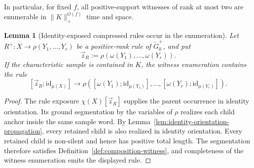 \documentclass[11pt,a4paper]{article}
\numberwithin{equation}{section}
\theoremstyle{plain}
\newtheorem{lemma}[theorem]{Lemma}
\theoremstyle{definition}
\theoremstyle{remark}
\newcommand{\tuple}[1]{\vec{#1}}
\begin{document}
In particular, for fixed \(f\), all positive-support witnesses of rank at
most two are enumerable in \(\|K\|_+^{O(f)}\) time and space.

\begin{lemma}[Identity-exposed compressed rules occur in the enumeration]
\label{lem:exposed-rule-enumerated}
Let \(R^+:X\to\rho(Y_1,\ldots,Y_r)\) be a positive-rank rule of
\(\widetilde G_0^+\), and put
\[
  \tuple z_R:=\rho(\omega(Y_1),\ldots,\omega(Y_r)).
\]
If the characteristic sample is contained in \(K\), the witness enumeration
contains the rule
\[
  [\tuple z_R;\mathrm{id}_{\mu(X)}]\to
  \rho([\omega(Y_1);\mathrm{id}_{\mu(Y_1)}],\ldots,
       [\omega(Y_r);\mathrm{id}_{\mu(Y_r)}]).
\]
\end{lemma}

\begin{proof}
The rule exposure \(\chi(X)[\tuple z_R]\) supplies the parent occurrence in
identity orientation.  Its ground segmentation by the variables of \(\rho\)
realizes each child anchor inside the same sample word.  By
Lemma~\ref{lem:identity-orientation-propagation}, every retained child is also
realized in identity orientation.  Every retained child is non-silent and
hence has positive total length.  The segmentation therefore satisfies
Definition~\ref{def:composition-witness}, and completeness of the witness
enumeration emits the displayed rule.
\end{proof}
\end{document}
